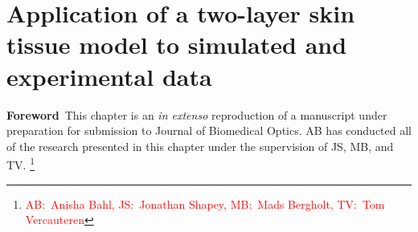 







\chapter[Application of a two-layer skin tissue model]{Application of a two-layer skin tissue model to simulated and experimental data}\label{chap:2layer}

\begin{center}
\begin{minipage}[b]{0.9\linewidth}
\small
\textbf{Foreword\,}
This chapter is an \emph{in extenso} reproduction of a manuscript under preparation for submission to Journal of Biomedical Optics. 
\newline
AB has conducted all of the research presented in this chapter under the supervision of JS, MB, and TV. \footnote{\textcolor{red}{AB:~Anisha Bahl, JS:~Jonathan Shapey, MB:~Mads Bergholt, TV:~Tom Vercauteren}}
\end{minipage}
\end{center}


